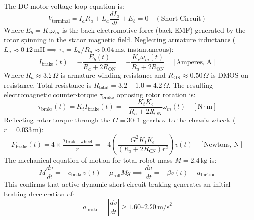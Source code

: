 \documentclass[11pt, a4paper]{article}
\begin{document}
The DC motor voltage loop equation is:
\begin{equation}
    V_{\text{terminal}} = I_a R_a + L_a \frac{dI_a}{dt} + E_b = 0 \quad (\text{Short Circuit})
\end{equation}
Where $E_b = K_e \omega_m$ is the back-electromotive force (back-EMF) generated by the rotor spinning in the stator magnetic field. Neglecting armature inductance ($L_a \approx 0.12\,\text{mH} \implies \tau_e = L_a/R_a \approx 0.04\,\text{ms}$, instantaneous):
\begin{equation}
    I_{\text{brake}}(t) = -\frac{E_b(t)}{R_a + 2R_{\text{ON}}} = -\frac{K_e \omega_m(t)}{R_a + 2R_{\text{ON}}} \quad [\text{Amperes, A}]
\end{equation}
Where $R_a \approx 3.2\,\Omega$ is armature winding resistance and $R_{\text{ON}} \approx 0.50\,\Omega$ is DMOS on-resistance. Total resistance is $R_{\text{total}} = 3.2 + 1.0 = 4.2\,\Omega$. The resulting electromagnetic counter-torque $\tau_{\text{brake}}$ opposing rotor rotation is:
\begin{equation}
    \tau_{\text{brake}}(t) = K_t I_{\text{brake}}(t) = -\frac{K_t K_e}{R_a + 2R_{\text{ON}}} \omega_m(t) \quad [\text{N}\cdot\text{m}]
\end{equation}
Reflecting rotor torque through the $G = 30:1$ gearbox to the chassis wheels ($r = 0.033\,\text{m}$):
\begin{equation}
    F_{\text{brake}}(t) = 4 \times \frac{\tau_{\text{brake, wheel}}}{r} = -4 \left(\frac{G^2 K_t K_e}{(R_a + 2R_{\text{ON}}) r^2}\right) v(t) \quad [\text{Newtons, N}]
\end{equation}
The mechanical equation of motion for total robot mass $M = 2.4\,\text{kg}$ is:
\begin{equation}
    M \frac{dv}{dt} = -c_{\text{brake}} v(t) - \mu_{\text{roll}} M g \implies \frac{dv}{dt} = -\beta v(t) - a_{\text{friction}}
\end{equation}
This confirms that active dynamic short-circuit braking generates an initial braking deceleration of:
\begin{equation}
    a_{\text{brake}} = \left| \frac{dv}{dt} \right| \ge 1.60\text{--}2.20\,\text{m/s}^2
\end{equation}
\end{document}

